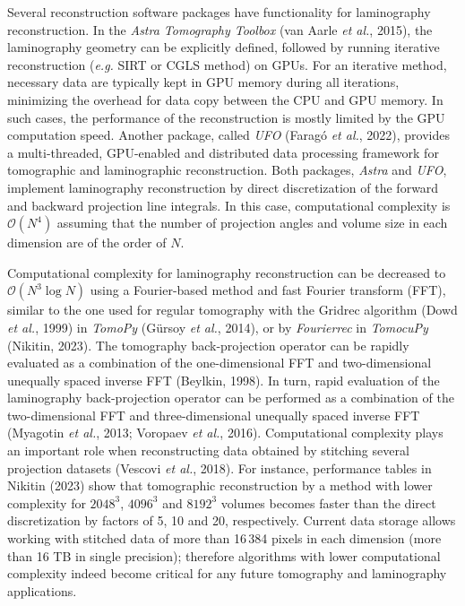 \documentclass{article}
\begin{document}
Several reconstruction software packages have functionality for laminography reconstruction. In the \emph{Astra Tomography Toolbox} (van Aarle \emph{et al.}, 2015), the laminography geometry can be explicitly defined, followed by running iterative reconstruction (\emph{e.g.} SIRT or CGLS method) on GPUs. For an iterative method, necessary data are typically kept in GPU memory during all iterations, minimizing the overhead for data copy between the CPU and GPU memory. In such cases, the performance of the reconstruction is mostly limited by the GPU computation speed. Another package, called \emph{UFO} (Faragó \emph{et al.}, 2022), provides a multi-threaded, GPU-enabled and distributed data processing framework for tomographic and laminographic reconstruction. Both packages, \emph{Astra} and \emph{UFO}, implement laminography reconstruction by direct discretization of the forward and backward projection line integrals. In this case, computational complexity is $\mathcal{O}(N^4)$ assuming that the number of projection angles and volume size in each dimension are of the order of $N$.

Computational complexity for laminography reconstruction can be decreased to $\mathcal{O}(N^3 \log N)$ using a Fourier-based method and fast Fourier transform (FFT), similar to the one used for regular tomography with the Gridrec algorithm (Dowd \emph{et al.}, 1999) in \emph{TomoPy} (Gürsoy \emph{et al.}, 2014), or by \emph{Fourierrec} in \emph{TomocuPy} (Nikitin, 2023). The tomography back-projection operator can be rapidly evaluated as a combination of the one-dimensional FFT and two-dimensional unequally spaced inverse FFT (Beylkin, 1998). In turn, rapid evaluation of the laminography back-projection operator can be performed as a combination of the two-dimensional FFT and three-dimensional unequally spaced inverse FFT (Myagotin \emph{et al.}, 2013; Voropaev \emph{et al.}, 2016). Computational complexity plays an important role when reconstructing data obtained by stitching several projection datasets (Vescovi \emph{et al.}, 2018). For instance, performance tables in Nikitin (2023) show that tomographic reconstruction by a method with lower complexity for $2048^3$, $4096^3$ and $8192^3$ volumes becomes faster than the direct discretization by factors of 5, 10 and 20, respectively. Current data storage allows working with stitched data of more than 16\,384 pixels in each dimension (more than 16 TB in single precision); therefore algorithms with lower computational complexity indeed become critical for any future tomography and laminography applications.
\end{document}
